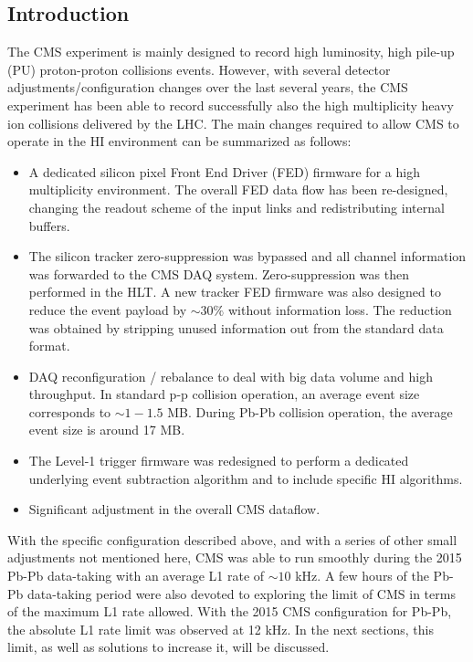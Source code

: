 \subsection{Introduction\label{subsec:HWintro}} 
The CMS experiment is mainly designed to record high luminosity, high pile-up (PU) proton-proton collisions events.
However, with several detector adjustments/configuration changes over the last several years, the CMS experiment has been able to record successfully also the high multiplicity heavy ion
collisions delivered by the LHC. The main changes required to allow CMS to
operate in the HI environment can be summarized as follows:

\begin{itemize} \item A dedicated silicon pixel Front End Driver (FED) firmware for a high multiplicity environment. The
overall FED data flow has been re-designed, changing the readout scheme of the input links and redistributing internal
buffers.

\item The silicon tracker zero-suppression was bypassed and all channel information was forwarded to the CMS DAQ system.
Zero-suppression was then performed in the HLT. A new tracker FED firmware was also designed to reduce the event payload
by $\sim 30 \%$ without information loss. The reduction was obtained by stripping unused information out from the
standard data format.

\item DAQ reconfiguration / rebalance to deal with big data volume and high throughput. In standard p-p collision
operation, an average event size corresponds to $\sim 1-1.5$ MB. During Pb-Pb collision operation, the average event
size is around 17 MB.

\item The Level-1 trigger firmware was redesigned to perform a dedicated underlying event subtraction algorithm and to
include specific HI algorithms.

\item Significant adjustment in the overall CMS dataflow. \end{itemize}


With the specific configuration described above, and with a series of other small adjustments not mentioned here, CMS
was able to run smoothly during the 2015 Pb-Pb data-taking with an average L1 rate of $\sim 10$ kHz. A few hours of the
Pb-Pb data-taking period were also devoted to exploring the limit of CMS in terms of the maximum L1 rate allowed.  With
the 2015 CMS configuration for Pb-Pb, the absolute L1 rate limit was observed at 12 kHz. In the next sections, this
limit, as well as solutions to increase it, will be discussed.

